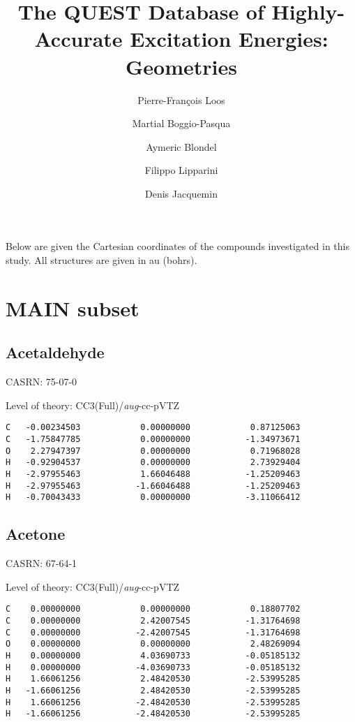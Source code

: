 \documentclass[journal=jctcce,manuscript=article,layout=traditional]{achemso}
\author{Pierre-Fran\c{c}ois Loos}
\affiliation[LCPQ, Toulouse]{\LCPQ}
\author{Martial Boggio-Pasqua}
\affiliation[LCPQ, Toulouse]{\LCPQ}
\author{Aymeric Blondel}
\affiliation[UN, Nantes]{\CEISAM}
\author{Filippo Lipparini}
\affiliation[UP, Pisa]{\UOP}
\author{Denis Jacquemin}
\affiliation[UN, Nantes]{\CEISAM}
\title{The QUEST Database of Highly-Accurate Excitation Energies:\\ Geometries}
\newcommand{\AVTZ}{\emph{aug}-cc-pVTZ}
\begin{document}
\clearpage

Below are given the Cartesian coordinates of the compounds investigated in this study. All structures are given in au (bohrs).

\clearpage

\section{MAIN subset}

\subsection{Acetaldehyde}

CASRN: 75-07-0

\begin{singlespace}
\noindent Level of theory: CC3(Full)/{\AVTZ}
\begin{verbatim}
C   -0.00234503            0.00000000            0.87125063
C   -1.75847785            0.00000000           -1.34973671
O    2.27947397            0.00000000            0.71968028
H   -0.92904537            0.00000000            2.73929404
H   -2.97955463            1.66046488           -1.25209463
H   -2.97955463           -1.66046488           -1.25209463
H   -0.70043433            0.00000000           -3.11066412
\end{verbatim}
\end{singlespace}

\subsection{Acetone}

CASRN: 67-64-1

\begin{singlespace}
\noindent Level of theory: CC3(Full)/{\AVTZ}
\begin{verbatim}
C    0.00000000            0.00000000            0.18807702
C    0.00000000            2.42007545           -1.31764698
C    0.00000000           -2.42007545           -1.31764698
O    0.00000000            0.00000000            2.48269094
H    0.00000000            4.03690733           -0.05185132
H    0.00000000           -4.03690733           -0.05185132
H    1.66061256            2.48420530           -2.53995285
H   -1.66061256            2.48420530           -2.53995285 
H    1.66061256           -2.48420530           -2.53995285
H   -1.66061256           -2.48420530           -2.53995285   
\end{verbatim}
\end{singlespace}
\end{document}
